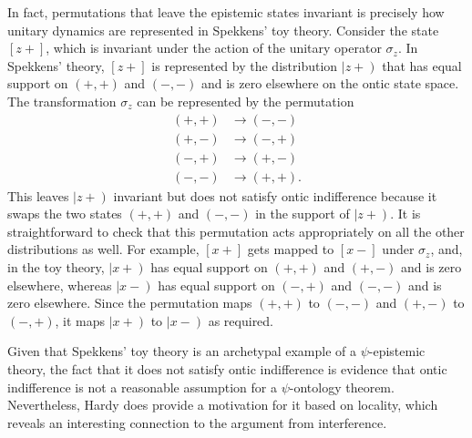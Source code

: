 \documentclass[DIV=calc,fontsize=12pt]{scrartcl} %
\theoremstyle{definition}
\theoremstyle{plain}
\newcommand{\RKet}[1]{\ensuremath{\left \vert #1 \right )}}
\newcommand{\Proj}[1]{\ensuremath{\left [ #1 \right ]}}
\begin{document}
In fact, permutations that leave the epistemic states invariant is
precisely how unitary dynamics are represented in Spekkens' toy
theory.  Consider the state $\Proj{z+}$, which is invariant under the
action of the unitary operator $\sigma_z$.  In Spekkens' theory,
$\Proj{z+}$ is represented by the distribution $\RKet{z+}$ that has
equal support on $(+,+)$ and $(-,-)$ and is zero elsewhere on the
ontic state space.  The transformation $\sigma_z$ can be represented
by the permutation
\begin{align}
(+,+) & \rightarrow (-,-) \\
(+,-) & \rightarrow (-,+) \\
(-,+) & \rightarrow (+,-) \\
(-,-) & \rightarrow (+,+).
\end{align}
This leaves $\RKet{z+}$ invariant but does not satisfy ontic
indifference because it swaps the two states $(+,+)$ and $(-,-)$ in
the support of $\RKet{z+}$.  It is straightforward to check that this
permutation acts appropriately on all the other distributions as well.
For example, $\Proj{x+}$ gets mapped to $\Proj{x-}$ under $\sigma_z$,
and, in the toy theory, $\RKet{x+}$ has equal support on $(+,+)$ and
$(+,-)$ and is zero elsewhere, whereas $\RKet{x-}$ has equal support
on $(-,+)$ and $(-,-)$ and is zero elsewhere.  Since the permutation
maps $(+,+)$ to $(-,-)$ and $(+,-)$ to $(-,+)$, it maps $\RKet{x+}$ to
$\RKet{x-}$ as required.

Given that Spekkens' toy theory is an archetypal example of a
$\psi$-epistemic theory, the fact that it does not satisfy ontic
indifference is evidence that ontic indifference is not a reasonable
assumption for a $\psi$-ontology theorem.  Nevertheless, Hardy does
provide a motivation for it based on locality, which reveals an
interesting connection to the argument from interference.
\end{document}
